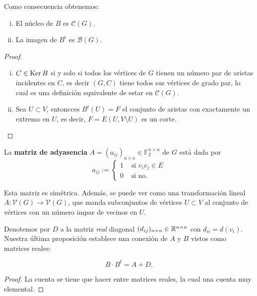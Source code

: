 \documentclass[../main.tex]{subfiles}
\begin{document}
Como consecuencia obtenemos:

\begin{corollary}
\begin{enumerate}[(i)]
\item El núcleo de $B$ es $\mathcal C(G)$.
\item La imagen de $B^t$ es $\mathcal B (G)$.
\end{enumerate}
\end{corollary}
\begin{proof}
\begin{enumerate}[(i)]
\item $C \in \operatorname{Ker} B$ si y solo si todos los vértices de $G$ tienen un número par de aristas incidentes en $C$, es
decir $(G,C)$ tiene todos sus vértices de grado par, lo cual es una definición equivalente de estar en $\mathcal C (G)$.
\item Sea $U \subset V$, entoncces $B^t (U) = F$ el conjunto de aristas con exactamente un extremo en $U$, es decir, $F = E(U, V \setminus U)$ es un corte.
\end{enumerate}
\end{proof}


\begin{definition}
La \textbf{matriz de adyasencia} $A = (a_{ij})_{n \times n} \in \mathbb{F}_2^{n \times n}$ de $G$ está dada por
\[
    a_{ij} := \begin{cases}
            1 & \text{ si $v_{i} v_j \in E$}\\
            0 & \text{ si no.}
                \end{cases}
\]
\end{definition}

\begin{obs}
Esta matriz es simétrica. Además, se puede ver como una transformación lineal $A : \mathcal V (G) \rightarrow \mathcal V (G)$, que manda subconjuntos de vértices $U \subset V$ al conjunto de vértices con un número impar de vecinos en $U$.
\end{obs}

Denotemos por $D$ a la matriz \textit{real} diagonal $(d_{ij})_{n \times n} \in \mathbb{R}^{n \times n}$ con $d_{ii} = d(
v_i)$. Nuestra última proposición establece una conexión de $A$ y $B$ vistos como matrices reales:

\begin{proposition}
$$
B \cdot B^t = A + D.
$$
\end{proposition}
\begin{proof}
La cuenta se tiene que hacer entre matrices reales, la cual una cuenta muy elemental.
\end{proof}
\end{document}
